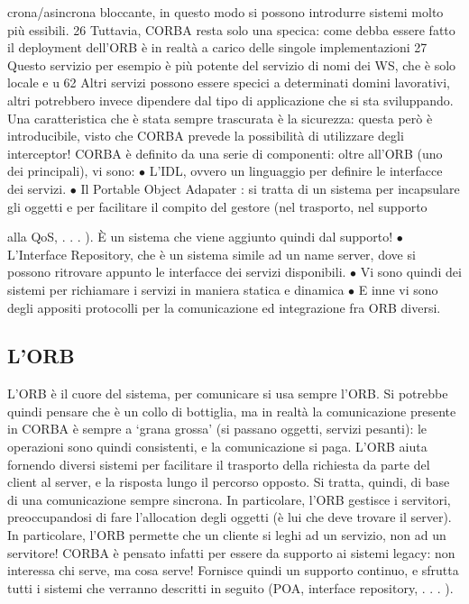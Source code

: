 crona/asincrona bloccante, in questo modo si possono introdurre sistemi
molto più essibili.
26 Tuttavia, CORBA resta solo una specica: come debba essere fatto il deployment
dell'ORB è in realtà a carico delle singole implementazioni
27 Questo servizio per esempio è più potente del servizio di nomi dei WS, che è solo locale
e u
62
Altri servizi possono essere specici a determinati domini lavorativi, altri potrebbero invece dipendere dal tipo di
applicazione che si sta sviluppando.
Una caratteristica che è stata sempre trascurata è la sicurezza: questa però è introducibile, visto che CORBA prevede 
la possibilità di utilizzare degli interceptor!
CORBA è definito da una serie di componenti: oltre all'ORB (uno dei
principali), vi sono:
$\bullet$ L'IDL, ovvero un linguaggio per definire le interfacce dei servizi.
$\bullet$ Il Portable Object Adapater : si tratta di un sistema per incapsulare gli
oggetti e per facilitare il compito del gestore (nel trasporto, nel supporto

alla QoS, . . . ). È un sistema che viene aggiunto quindi dal supporto!
$\bullet$ L'Interface Repository, che è un sistema simile ad un name server, dove si
possono ritrovare appunto le interfacce dei servizi disponibili.
$\bullet$ Vi sono quindi dei sistemi per richiamare i servizi in maniera statica e
dinamica
$\bullet$ E inne vi sono degli appositi protocolli per la comunicazione ed integrazione fra ORB diversi.
\subsection{L'ORB}
L'ORB è il cuore del sistema, per comunicare si usa sempre l'ORB. Si potrebbe
quindi pensare che è un collo di bottiglia, ma in realtà la comunicazione presente
in CORBA è sempre a {`}grana grossa' (si passano oggetti, servizi pesanti): le
operazioni sono quindi consistenti, e la comunicazione si paga. L'ORB aiuta
fornendo diversi sistemi per facilitare il trasporto della richiesta da parte del
client al server, e la risposta lungo il percorso opposto. Si tratta, quindi, di base
di una comunicazione sempre sincrona.
In particolare, l'ORB gestisce i servitori, preoccupandosi di fare l'allocation
degli oggetti (è lui che deve trovare il server). In particolare, l'ORB permette
che un cliente si leghi ad un servizio, non ad un servitore! CORBA è pensato
infatti per essere da supporto ai sistemi legacy: non interessa chi serve, ma
cosa serve! Fornisce quindi un supporto continuo, e sfrutta tutti i sistemi che
verranno descritti in seguito (POA, interface repository, . . . ).
